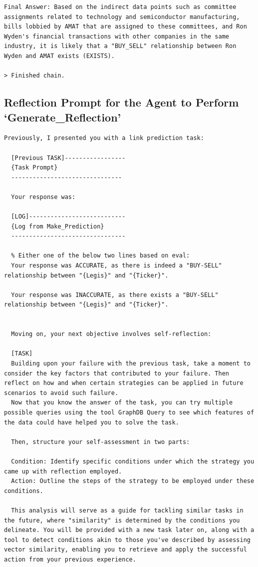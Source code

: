 \documentclass[15pt,letterpaper]{article}
\begin{document}
\begin{Verbatim}[breaklines=true, frame=single]
Final Answer: Based on the indirect data points such as committee assignments related to technology and semiconductor manufacturing, bills lobbied by AMAT that are assigned to these committees, and Ron Wyden's financial transactions with other companies in the same industry, it is likely that a "BUY_SELL" relationship between Ron Wyden and AMAT exists (EXISTS).

> Finished chain.
\end{Verbatim}

\subsection*{Reflection Prompt for the Agent to Perform `Generate\_Reflection'}\label{app:log:reflect_prompt}
\begin{Verbatim}[breaklines=true, frame=single]
  Previously, I presented you with a link prediction task:

  [Previous TASK]-----------------
  {Task Prompt}
  -------------------------------

  Your response was:

  [LOG]---------------------------
  {Log from Make_Prediction}
  --------------------------------

  % Either one of the below two lines based on eval:
  Your response was ACCURATE, as there is indeed a "BUY-SELL" relationship between "{Legis}" and "{Ticker}".

  Your response was INACCURATE, as there exists a "BUY-SELL" relationship between "{Legis}" and "{Ticker}".  


  Moving on, your next objective involves self-reflection:

  [TASK]
  Building upon your failure with the previous task, take a moment to consider the key factors that contributed to your failure. Then reflect on how and when certain strategies can be applied in future scenarios to avoid such failure. 
  Now that you know the answer of the task, you can try multiple possible queries using the tool GraphDB Query to see which features of the data could have helped you to solve the task.

  Then, structure your self-assessment in two parts:

  Condition: Identify specific conditions under which the strategy you came up with reflection employed.
  Action: Outline the steps of the strategy to be employed under these conditions.

  This analysis will serve as a guide for tackling similar tasks in the future, where "similarity" is determined by the conditions you delineate. You will be provided with a new task later on, along with a tool to detect conditions akin to those you've described by assessing vector similarity, enabling you to retrieve and apply the successful action from your previous experience.


\end{Verbatim}
\end{document}
